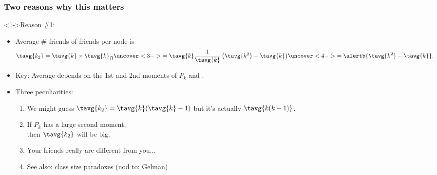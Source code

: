 \begin{frame}[label=]
  \frametitle{Two reasons why this matters}
  
  \small
  
  \begin{block}<1->{Reason \#1:}
    \begin{itemize}
    \item<2-> 
      Average \# friends of friends per node
      is 
      $$
      \tavg{k_2}
      =
      \tavg{k} \times \tavg{k}_{R}
      \uncover<3->{
        =
        \tavg{k}
        \frac{1}{\tavg{k}}
        \left(
          \tavg{k^2} - \tavg{k}
        \right)
      }
      \uncover<4->{
        = \alertb{\tavg{k^2} - \tavg{k}}.
      }
      $$
    \item<5->
      Key: Average depends on the \alert{1st and 2nd
        moments} of $P_k$ and .
    \item<6->
      Three peculiarities:
      \begin{enumerate}
      \item<6->
        We might guess $\tavg{k_2} = \tavg{k}(\tavg{k}-1)$
        but it's actually $\tavg{k(k-1)}$.
      \item<7->
        If $P_k$ has a \alert{large second moment},\\
        then $\tavg{k_2}$ will be big.\\
      \item<9->
        Your friends really are different from you...\cite{feld1991a,newman2003h}
      \item<10->
        See also: class size paradoxes (nod to: Gelman)
      \end{enumerate}
    \end{itemize}
    
  \end{block}
  
\end{frame}

